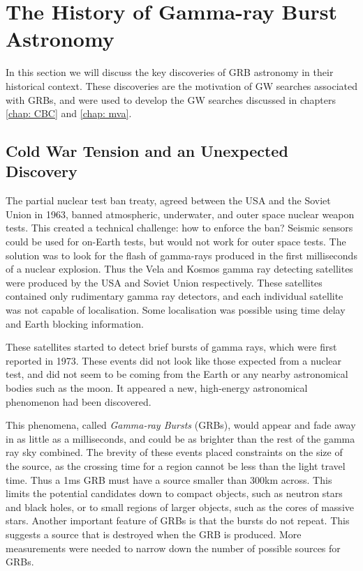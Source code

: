 \documentclass[11pt]{cuthesis}
\begin{document}
\section{The History of Gamma-ray Burst Astronomy} \label{sec:GRB history}
In this section we will discuss the key discoveries of GRB astronomy in their historical context. These discoveries are the motivation of GW searches associated with GRBs, and were used to develop the GW searches discussed in chapters \ref{chap: CBC} and \ref{chap: mva}.  

\subsection{Cold War Tension and an Unexpected Discovery} \label{sec:cold war}
The partial nuclear test ban treaty, agreed between the USA and the Soviet Union in 1963, banned atmospheric, underwater, and outer space nuclear weapon tests. This created a technical challenge: how to enforce the ban? Seismic sensors could be used for on-Earth tests, but would not work for outer space tests. The solution was to look for the flash of gamma-rays produced in the first milliseconds of a nuclear explosion. Thus the Vela and Kosmos gamma ray detecting satellites were produced by the USA and Soviet Union respectively. These satellites contained only rudimentary gamma ray detectors, and each individual satellite was not capable of localisation. Some localisation was possible using time delay and Earth blocking information.

These satellites started to detect brief bursts of gamma rays, which were first reported in 1973. These events did not look like those expected from a nuclear test, and did not seem to be coming from the Earth or any nearby astronomical bodies such as the moon. It appeared a new, high-energy astronomical phenomenon had been discovered. 

This phenomena, called \textit{Gamma-ray Bursts} (GRBs), would appear and fade away in as little as a milliseconds, and could be as brighter than the rest of the gamma ray sky combined. The brevity of these events placed constraints on the size of the source, as the crossing time for a region cannot be less than the light travel time. Thus a 1ms GRB must have a source smaller than 300km across. This limits the potential candidates down to compact objects, such as neutron stars and black holes, or to small regions of larger objects, such as the cores of massive stars. Another important feature of GRBs is that the bursts do not repeat. This suggests a source that is destroyed when the GRB is produced. More measurements were needed to narrow down the number of possible sources for GRBs. 
\end{document}
